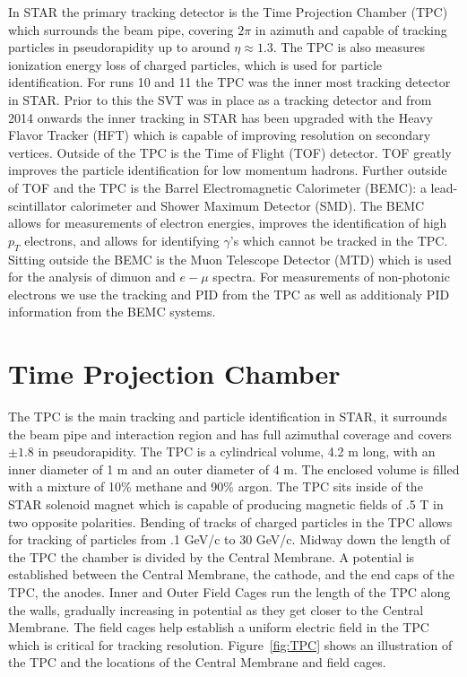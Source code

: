 In STAR the primary tracking detector is the Time Projection Chamber (TPC) which surrounds the beam pipe, covering $2\pi$ in azimuth and capable of tracking particles in pseudorapidity up to around $\eta \approx 1.3$. The TPC is also measures ionization energy loss of charged particles, which is used for particle identification. For runs 10 and 11 the TPC was the inner most tracking detector in STAR. Prior to this the SVT was in place as a tracking detector and from 2014 onwards the inner tracking in STAR has been upgraded with the Heavy Flavor Tracker (HFT) which is capable of improving resolution on secondary vertices. Outside of the TPC is the Time of Flight (TOF) detector. TOF greatly improves the particle identification for low momentum hadrons. Further outside of TOF and the TPC is the Barrel Electromagnetic Calorimeter (BEMC): a lead-scintillator calorimeter and Shower Maximum Detector (SMD). The BEMC allows for measurements of electron energies, improves the identification of high $p_T$ electrons, and allows for identifying $\gamma$'s which cannot be tracked in the TPC. Sitting outside the BEMC is the Muon Telescope Detector (MTD) which is used for the analysis of dimuon and $e-\mu$ spectra. For measurements of non-photonic electrons we use the tracking and PID from the TPC as well as additionaly PID information from the BEMC systems.

\section{Time Projection Chamber}

The TPC is the main tracking and particle identification in STAR, it surrounds the beam pipe and interaction region and has full azimuthal coverage and covers $\pm 1.8$ in pseudorapidity. The TPC is a cylindrical volume, 4.2 m long, with an inner diameter of 1 m and an outer diameter of 4 m. The enclosed volume is filled with a mixture of 10\% methane and 90\% argon. The TPC sits inside of the STAR solenoid magnet which is capable of producing magnetic fields of .5 T in two opposite polarities. Bending of tracks of charged particles in the TPC allows for tracking of particles from .1 GeV/c to 30 GeV/c. Midway down the length of the TPC the chamber is divided by the Central Membrane. A potential is established between the Central Membrane, the cathode, and the end caps of the TPC, the anodes. Inner and Outer Field Cages run the length of the TPC along the walls, gradually increasing in potential as they get closer to the Central Membrane. The field cages help establish a uniform electric field in the TPC which is critical for tracking resolution. Figure~\ref{fig:TPC} shows an illustration of the TPC and the locations of the Central Membrane and field cages.

